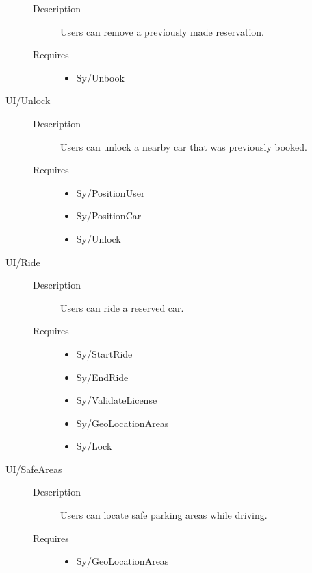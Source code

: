 \documentclass[11pt]{article} %
\begin{document}
\begin{description}
	\begin{description}
		\item[Description] Users can remove a previously made reservation.
		\item[Requires] \hfill
		\begin{itemize}
			\item Sy/Unbook %
		\end{itemize}
	\end{description}
	\item[UI/Unlock] \hfill
	\begin{description}
		\item[Description] Users can unlock a nearby car that was previously booked.
		\item[Requires] \hfill
		\begin{itemize}
			\item Sy/PositionUser %
			\item Sy/PositionCar %
			\item Sy/Unlock %
		\end{itemize}
	\end{description}
	\item[UI/Ride] \hfill
	\begin{description}
		\item[Description] Users can ride a reserved car.
		\item[Requires] \hfill
		\begin{itemize}
			\item Sy/StartRide %
			\item Sy/EndRide %
			\item Sy/ValidateLicense %
			\item Sy/GeoLocationAreas %
			\item Sy/Lock %
		\end{itemize}
	\end{description}
	\item[UI/SafeAreas] \hfill
	\begin{description}
		\item[Description] Users can locate safe parking areas while driving.
		\item[Requires] \hfill
		\begin{itemize}
			\item Sy/GeoLocationAreas %

\end{itemize}
\end{description}
\end{description}
\end{document}
